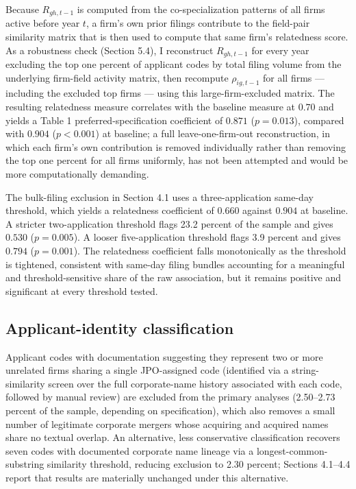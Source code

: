 \documentclass[12pt]{article}
\begin{document}
Because $R_{gh,t-1}$ is computed from the co-specialization patterns of all firms active before year $t$, a firm's own prior filings contribute to the field-pair similarity matrix that is then used to compute that same firm's relatedness score. As a robustness check (Section 5.4), I reconstruct $R_{gh,t-1}$ for every year excluding the top one percent of applicant codes by total filing volume from the underlying firm-field activity matrix, then recompute $\rho_{ig,t-1}$ for all firms --- including the excluded top firms --- using this large-firm-excluded matrix. The resulting relatedness measure correlates with the baseline measure at $0.70$ and yields a Table 1 preferred-specification coefficient of $0.871$ ($p=0.013$), compared with $0.904$ ($p<0.001$) at baseline; a full leave-one-firm-out reconstruction, in which each firm's own contribution is removed individually rather than removing the top one percent for all firms uniformly, has not been attempted and would be more computationally demanding.

The bulk-filing exclusion in Section 4.1 uses a three-application same-day threshold, which yields a relatedness coefficient of $0.660$ against $0.904$ at baseline. A stricter two-application threshold flags 23.2 percent of the sample and gives $0.530$ ($p=0.005$). A looser five-application threshold flags 3.9 percent and gives $0.794$ ($p=0.001$). The relatedness coefficient falls monotonically as the threshold is tightened, consistent with same-day filing bundles accounting for a meaningful and threshold-sensitive share of the raw association, but it remains positive and significant at every threshold tested.

\subsection{Applicant-identity classification}

Applicant codes with documentation suggesting they represent two or more unrelated firms sharing a single JPO-assigned code (identified via a string-similarity screen over the full corporate-name history associated with each code, followed by manual review) are excluded from the primary analyses (2.50--2.73 percent of the sample, depending on specification), which also removes a small number of legitimate corporate mergers whose acquiring and acquired names share no textual overlap. An alternative, less conservative classification recovers seven codes with documented corporate name lineage via a longest-common-substring similarity threshold, reducing exclusion to 2.30 percent; Sections 4.1--4.4 report that results are materially unchanged under this alternative.
\end{document}
